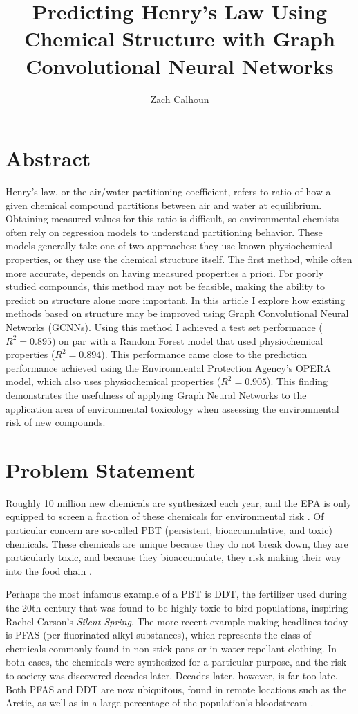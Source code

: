 \documentclass[12pt, oneside]{article}   	%
\title{Predicting Henry's Law Using Chemical Structure with Graph Convolutional Neural Networks}
\author{Zach Calhoun}
\begin{document}
\maketitle

\section{Abstract}
Henry's law, or the air/water partitioning coefficient, refers to ratio of how a given chemical compound partitions between air and water at equilibrium. Obtaining measured values for this ratio is difficult, so environmental chemists often rely on regression models to understand partitioning behavior. These models generally take one of two approaches: they use known physiochemical properties, or they use the chemical structure itself. The first method, while often more accurate, depends on having measured properties a priori. For poorly studied compounds, this method may not be feasible, making the ability to predict on structure alone more important. In this article I explore how existing methods based on structure may be improved using Graph Convolutional Neural Networks (GCNNs). Using this method I achieved a test set performance ($R^2=0.895$) on par with a Random Forest model that used physiochemical properties ($R^2=0.894$). This performance came close to the prediction performance achieved using the Environmental Protection Agency's OPERA model, which also uses physiochemical properties ($R^2 = 0.905$). This finding demonstrates the usefulness of applying Graph Neural Networks to the application area of environmental toxicology when assessing the environmental risk of new compounds.

\section{Problem Statement}
Roughly 10 million new chemicals are synthesized each year, and the EPA is only equipped to screen a fraction of these chemicals for environmental risk \cite{burton}. Of particular concern are so-called PBT (persistent, bioaccumulative, and toxic) chemicals. These chemicals are unique because they do not break down, they are particularly toxic, and because they bioaccumulate, they risk making their way into the food chain \cite{matthies}.

Perhaps the most infamous example of a PBT is DDT, the fertilizer used during the 20th century that was found to be highly toxic to bird populations, inspiring Rachel Carson's \emph{Silent Spring}. The more recent example making headlines today is PFAS (per-fluorinated alkyl substances), which represents the class of chemicals commonly found in non-stick pans or in water-repellant clothing. In both cases, the chemicals were synthesized for a particular purpose, and the risk to society was discovered decades later. Decades later, however, is far too late. Both PFAS and DDT are now ubiquitous, found in remote locations such as the Arctic, as well as in a large percentage of the population's bloodstream \cite{czub}.
\end{document}
